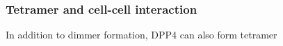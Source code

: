 \subsubsection{Tetramer and cell-cell interaction}

In addition to dimmer formation, DPP4 can also form tetramer